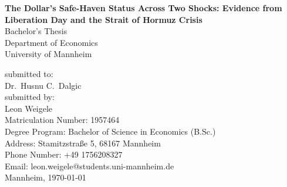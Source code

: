 
\begin{titlepage}

\begin{center}

\vspace*{1.2cm}

\huge {\bfseries
The Dollar's Safe-Haven Status Across Two Shocks: Evidence from Liberation Day and the Strait of Hormuz Crisis}\\[1cm]

\Large {Bachelor's Thesis}\\[1cm]

\large {Department of Economics}\\[0.2cm]

\large {University of Mannheim}\\[0.5cm]

\end{center}

\vfill

\noindent submitted to:\\
Dr.\ Husnu C.\ Dalgic\\[1cm]
submitted by:\\
Leon Weigele\\[1cm]
Matriculation Number: 1957464\\
Degree Program: Bachelor of Science in Economics (B.Sc.)\\[1cm]
Address: Stamitzstraße 5, 68167 Mannheim\\
Phone Number: +49 1756208327\\
Email: leon.weigele@students.uni-mannheim.de\\[1cm]
Mannheim, \today

\setcounter{page}{0}

\end{titlepage}

